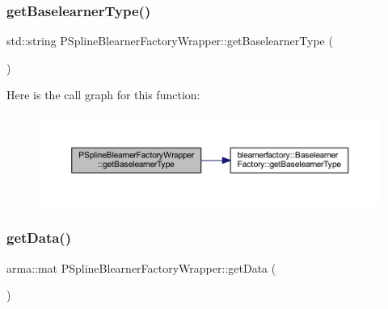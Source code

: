 \subsubsection{\texorpdfstring{get\+Baselearner\+Type()}{getBaselearnerType()}}
{\footnotesize\ttfamily std\+::string P\+Spline\+Blearner\+Factory\+Wrapper\+::get\+Baselearner\+Type (\begin{DoxyParamCaption}{ }\end{DoxyParamCaption})\hspace{0.3cm}{\ttfamily [inline]}}

Here is the call graph for this function\+:
\nopagebreak
\begin{figure}[H]
\begin{center}
\leavevmode
\includegraphics[width=350pt]{class_p_spline_blearner_factory_wrapper_a13ca216f7c9673bb66598c9be0e44b03_cgraph}
\end{center}
\end{figure}
\mbox{\label{class_p_spline_blearner_factory_wrapper_a7613c56ca05f36f8365a1d5987bbf823}} 
\subsubsection{\texorpdfstring{get\+Data()}{getData()}}
{\footnotesize\ttfamily arma\+::mat P\+Spline\+Blearner\+Factory\+Wrapper\+::get\+Data (\begin{DoxyParamCaption}{ }\end{DoxyParamCaption})\hspace{0.3cm}{\ttfamily [inline]}}

